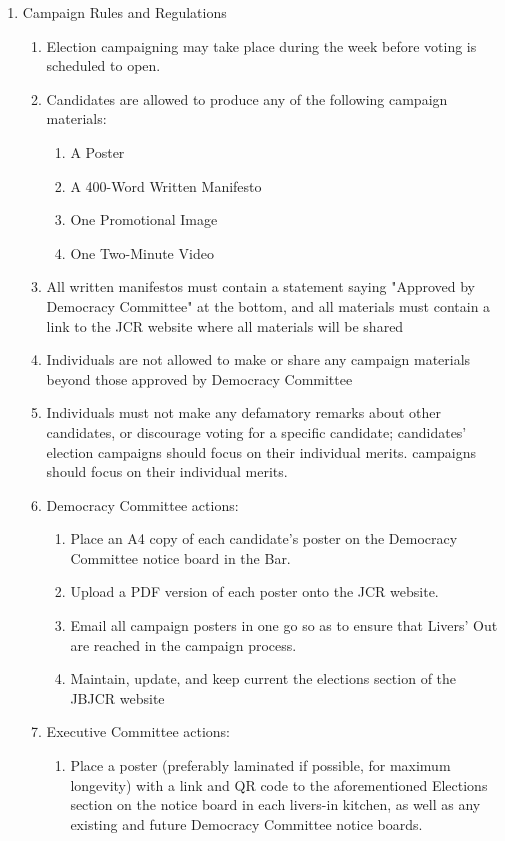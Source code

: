 \begin{enumerate}
\begin{enumerate}
    \end{enumerate}
    \item Campaign Rules and Regulations
    \label{it:rules}
    \begin{enumerate}
        \item Election campaigning may take place during the week before voting is scheduled to open.
        \item Candidates are allowed to produce any of the following campaign materials:
        \begin{enumerate}
            \item A Poster
            \item A 400-Word Written Manifesto
            \item One Promotional Image
            \item One Two-Minute Video 
        \end{enumerate}
        \item All written manifestos must contain a statement saying "Approved by Democracy Committee" at the bottom, and all materials must contain a link to the JCR website where all materials will be shared
        \item Individuals are not allowed to make or share any campaign materials beyond those approved by Democracy Committee 
        \item Individuals must not make any defamatory remarks about other candidates, or discourage voting for a specific candidate; candidates’ election campaigns should focus on their individual merits.
        campaigns should focus on their individual merits.
        \item Democracy Committee actions:
        \begin{enumerate}
            \item Place an A4 copy of each candidate’s poster on the Democracy Committee notice board in the Bar.
            \item Upload a PDF version of each poster onto the JCR website.
            \item Email all campaign posters in one go so as to ensure that Livers’ Out are reached in the campaign process.
            \item Maintain, update, and keep current the elections section of the JBJCR website 
        \end{enumerate}
        \item Executive Committee actions:
        \begin{enumerate}
            \item Place a poster (preferably laminated if possible, for maximum longevity) with a link and QR code to the aforementioned Elections section on the notice board in each livers-in kitchen, as well as any existing and future Democracy Committee notice boards.

\end{enumerate}
\end{enumerate}
\end{enumerate}
